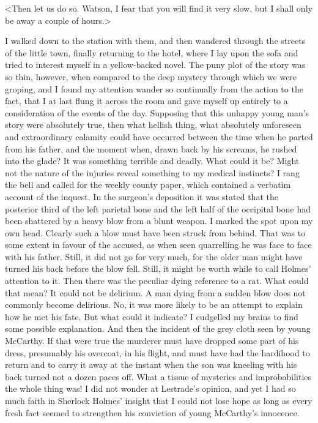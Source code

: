 <Then let us do so. Watson, I fear that you will find it very slow, but I shall only be away a couple of hours.>

I walked down to the station with them, and then wandered through the streets of the little town, finally returning to the hotel, where I lay upon the sofa and tried to interest myself in a yellow-backed novel. The puny plot of the story was so thin, however, when compared to the deep mystery through which we were groping, and I found my attention wander so continually from the action to the fact, that I at last flung it across the room and gave myself up entirely to a consideration of the events of the day. Supposing that this unhappy young man's story were absolutely true, then what hellish thing, what absolutely unforeseen and extraordinary calamity could have occurred between the time when he parted from his father, and the moment when, drawn back by his screams, he rushed into the glade? It was something terrible and deadly. What could it be? Might not the nature of the injuries reveal something to my medical instincts? I rang the bell and called for the weekly county paper, which contained a verbatim account of the inquest. In the surgeon's deposition it was stated that the posterior third of the left parietal bone and the left half of the occipital bone had been shattered by a heavy blow from a blunt weapon. I marked the spot upon my own head. Clearly such a blow must have been struck from behind. That was to some extent in favour of the accused, as when seen quarrelling he was face to face with his father. Still, it did not go for very much, for the older man might have turned his back before the blow fell. Still, it might be worth while to call Holmes' attention to it. Then there was the peculiar dying reference to a rat. What could that mean? It could not be delirium. A man dying from a sudden blow does not commonly become delirious. No, it was more likely to be an attempt to explain how he met his fate. But what could it indicate? I cudgelled my brains to find some possible explanation. And then the incident of the grey cloth seen by young McCarthy. If that were true the murderer must have dropped some part of his dress, presumably his overcoat, in his flight, and must have had the hardihood to return and to carry it away at the instant when the son was kneeling with his back turned not a dozen paces off. What a tissue of mysteries and improbabilities the whole thing was! I did not wonder at Lestrade's opinion, and yet I had so much faith in Sherlock Holmes' insight that I could not lose hope as long as every fresh fact seemed to strengthen his conviction of young McCarthy's innocence.

